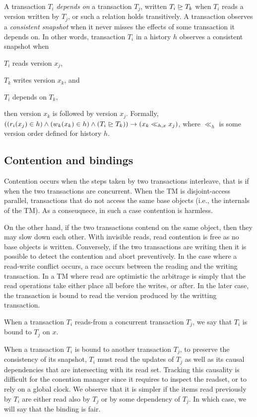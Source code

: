 A transaction $T_i$ \emph{depends on} a transaction $T_j$, written $T_i \mathrel{\unrhd} T_k$ when $T_i$ reads a version written by $T_j$, or such a relation holds transitively.
A transaction observes a \emph{consistent snapshot} \cite{Chan:1985} when it never misses the effects of some transaction it depends on.
In other words, transaction $T_i$ in a history $h$ observes a consistent snapshot when
\begin{inparaenum}
\item $T_i$ reads version $x_j$,
\item $T_k$ writes version $x_k$, and 
\item $T_i$ depends on $T_{k}$,
\end{inparaenum}
then version $x_k$ is followed by version $x_j$.
Formally, $((r_i(x_j) \in h) \land (w_k(x_k) \in h) \land (T_i \depends T_k)) \implies (x_k \ll_{h,x} x_j)$, where $\ll_{h}$ is some version order defined for history $h$.

\subsection{Contention and bindings}

Contention occurs when the steps taken by two transactions interleave, that is if when the two transactions are concurrent.
When the TM is disjoint-access parallel, transactions that do not access the same base objects (i.e., the internals of the TM).
As a conseuqnece, in such a case contention is harmless.

On the other hand, if the two transactions contend on the same object, then they may slow down each other.
With invisible reads, read contention is free as no base objects is written.
Conversely, if the two transactions are writing then it is possible to detect the contention and abort preventively.
In the case where a read-write conflict occurs, a race occurs between the reading and the writing transaction.
In a TM where read are optimistic the arbitrage is simply that the read operations take either place all before the writes, or after.
In the later case, the transaction is bound to read the version produced by the writting transaction.

\begin{definition}[Binding]
  When a transaction $T_i$ reads-from a concurrent transaction $T_j$, we say that $T_i$ is bound to $T_j$ on $x$.
\end{definition}

When a transaction $T_i$ is bound to another transaction $T_j$, to preserve the consistency of its snapshot, $T_i$ must read the updates of $T_j$ as well as its causal dependencies that are intersecting with its read set.
Tracking this causality is difficult for the conention manager since it requires to inspect the readset, or to rely on a global clock.
We observe that it is simpler if the items read previously by $T_i$ are either read also by $T_j$ or by some dependency of $T_j$.
In which case, we will say that the binding is fair.

